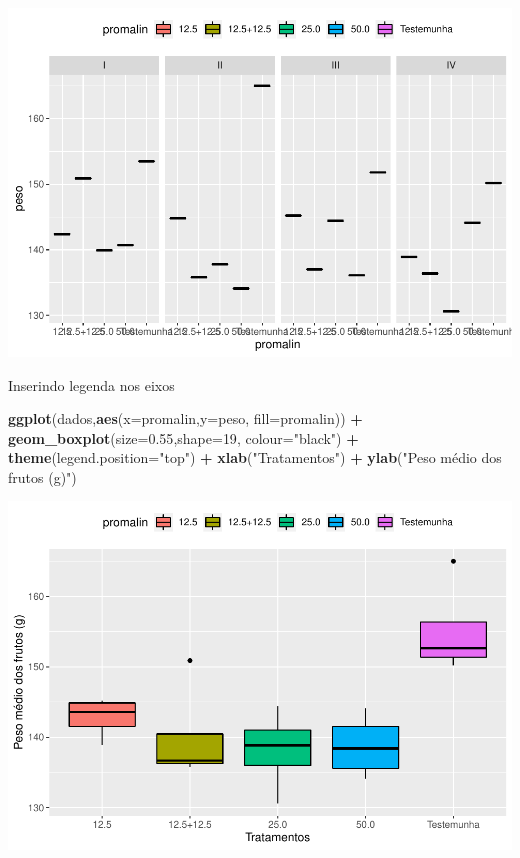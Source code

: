 \documentclass[
]{book}
\newenvironment{Shaded}{\begin{snugshade}}{\end{snugshade}}
\newcommand{\DataTypeTok}[1]{\textcolor[rgb]{0.13,0.29,0.53}{#1}}
\newcommand{\DecValTok}[1]{\textcolor[rgb]{0.00,0.00,0.81}{#1}}
\newcommand{\FloatTok}[1]{\textcolor[rgb]{0.00,0.00,0.81}{#1}}
\newcommand{\KeywordTok}[1]{\textcolor[rgb]{0.13,0.29,0.53}{\textbf{#1}}}
\newcommand{\NormalTok}[1]{#1}
\newcommand{\OperatorTok}[1]{\textcolor[rgb]{0.81,0.36,0.00}{\textbf{#1}}}
\newcommand{\StringTok}[1]{\textcolor[rgb]{0.31,0.60,0.02}{#1}}
\begin{document}
\includegraphics{TudodoR_files/figure-latex/unnamed-chunk-234-1.pdf}

Inserindo legenda nos eixos

\begin{Shaded}
\begin{Highlighting}[]
\KeywordTok{ggplot}\NormalTok{(dados,}\KeywordTok{aes}\NormalTok{(}\DataTypeTok{x=}\NormalTok{promalin,}\DataTypeTok{y=}\NormalTok{peso, }\DataTypeTok{fill=}\NormalTok{promalin)) }\OperatorTok{+}\StringTok{ }
\StringTok{       }\KeywordTok{geom_boxplot}\NormalTok{(}\DataTypeTok{size=}\FloatTok{0.55}\NormalTok{,}\DataTypeTok{shape=}\DecValTok{19}\NormalTok{, }\DataTypeTok{colour=}\StringTok{"black"}\NormalTok{) }\OperatorTok{+}\StringTok{ }
\StringTok{       }\KeywordTok{theme}\NormalTok{(}\DataTypeTok{legend.position=}\StringTok{"top"}\NormalTok{) }\OperatorTok{+}\StringTok{ }
\StringTok{       }\KeywordTok{xlab}\NormalTok{(}\StringTok{"Tratamentos"}\NormalTok{) }\OperatorTok{+}\StringTok{  }
\StringTok{       }\KeywordTok{ylab}\NormalTok{(}\StringTok{"Peso médio dos frutos (g)"}\NormalTok{) }
\end{Highlighting}
\end{Shaded}

\includegraphics{TudodoR_files/figure-latex/unnamed-chunk-235-1.pdf}
\end{document}
